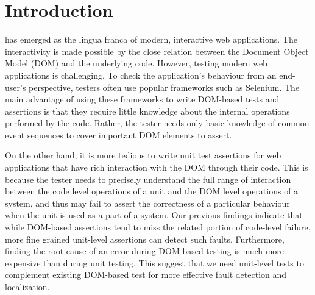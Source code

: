 \section{Introduction} \label{Sec:intro}

\javascript has emerged as the lingua franca of modern, interactive web applications. 
The interactivity is made possible by the close relation between the Document Object Model (DOM) and the underlying \javascript code.
However, testing modern web applications is challenging.  
To check the application's behaviour from an end-user's perspective, testers often use popular frameworks such as Selenium. 
The main advantage of using these frameworks to write DOM-based tests and assertions is that they require little knowledge about the internal operations performed by the code. 
Rather, the tester needs only basic knowledge of common event sequences to cover important DOM elements to assert. 

 
On the other hand, it is more tedious to
write unit test assertions for web applications that have rich interaction with the DOM through their \javascript code. 
This is because the tester needs to precisely understand the full range of interaction between the code level operations of a unit and the DOM level operations of a system, 
and thus may fail to assert the correctness of a particular behaviour when the unit is used as a part of a system. 
Our previous findings \cite{mirshokraie:icst15} indicate that while DOM-based assertions tend to miss the related portion of
code-level failure, more fine grained unit-level assertions can detect such faults. 
Furthermore, finding the root cause of an error during DOM-based testing is much more expensive than during unit testing.
This suggest that we need unit-level tests to complement existing DOM-based test for more effective fault detection and localization.

